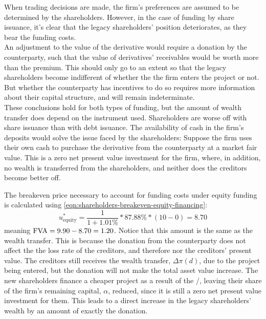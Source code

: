 \documentclass[main.tex]{subfiles}
\begin{document}
        When trading decisions are made, the firm's preferences are assumed to be determined by the shareholders.
        However, in the case of funding by share issuance, it's clear that the legacy shareholders' position deteriorates, as they bear the funding costs.\\
        An adjustment to the value of the derivative would require a donation by the counterparty, such that the value of derivatives' receivables would be worth more than the premium.
        This should only go to an extent so that the legacy shareholders become indifferent of whether the the firm enters the project or not.
        But whether the counterparty has incentives to do so requires more information about their capital structure, and will remain indeterminate.\\
        These conclusions hold for both types of funding, but the amount of wealth transfer does depend on the instrument used. Shareholders are worse off with share issuance than with debt issuance.
        The availability of cash in the firm's deposits would solve the issue faced by the shareholders:
        Suppose the firm uses their own cash to purchase the derivative from the counterparty at a market fair value.
        This is a zero net present value investment for the firm, where, in addition, no wealth is transferred from the shareholders, and neither does the creditors become better off. 

        The breakeven price necessary to account for funding costs under equity funding is calculated using
        \cref{eqn:shareholders-breakeven-equity-financing}:
            \begin{equation}
                    u^{\ast}_{\text{equity}} 
                =
                    \frac{1}{1 + 1.01\%} 
                    *
                    87.88\%
                    *
                    \left(
                        10
                        -
                        0
                    \right)
                =
                    8.70
            \end{equation}
        meaning $\FVA/ = 9.90-8.70 = 1.20$. Notice that this amount is the same as the wealth transfer.
        This is because the donation from the counterparty does not affect the the loss rate of the creditors, and therefore nor the creditors' present value.
        The creditors still receives the wealth transfer, $\Delta \pi(d)$,
        due to the project being entered, but the donation will not make the total asset value increase.
        The new shareholders finance a cheaper project as a result of the \FVA/, leaving their share of the firm's remaining capital, $\alpha$, reduced, since it is still a zero net present value investment for them.
        This leads to a direct increase in the legacy shareholders' wealth by an amount of exactly the donation. 
\end{document}
